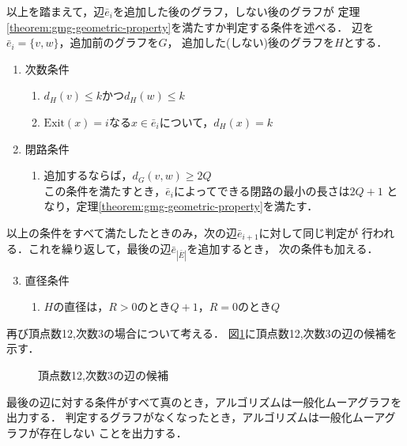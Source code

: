 以上を踏まえて，辺$\bar{e}_i$を追加した後のグラフ，しない後のグラフが
定理\ref{theorem:gmg-geometric-property}を満たすか判定する条件を述べる．
辺を$\bar{e}_i=\{v,w\}$，追加前のグラフを$G$，
追加した(しない)後のグラフを$H$とする．
\begin{enumerate}
\item 次数条件
  \label{item:degree-constraint}
  \begin{enumerate}
  \item $d_H(v)\leq k$かつ$d_H(w)\leq k$
  \item $\mathrm{Exit}(x)=i$なる$x\in\bar{e}_i$について，$d_H(x)=k$
  \end{enumerate}
\item 閉路条件
  \label{item:cycle-constraint}
  \begin{enumerate}
  \item 追加するならば，$d_G(v,w)\geq2Q$\\
    この条件を満たすとき，$\bar{e}_i$によってできる閉路の最小の長さは$2Q+1$
    となり，定理\ref{theorem:gmg-geometric-property}を満たす．
  \end{enumerate}
\end{enumerate}
以上の条件をすべて満たしたときのみ，次の辺$\bar{e}_{i+1}$に対して同じ判定が
行われる．これを繰り返して，最後の辺$\bar{e}_{|\bar{E}|}$を追加するとき，
次の条件も加える．
\begin{enumerate}\setcounter{enumi}{2}
\item 直径条件
  \label{item:diameter-constraint}
  \begin{enumerate}
  \item $H$の直径は，$R>0$のとき$Q+1$，$R=0$のとき$Q$
  \end{enumerate}
\end{enumerate}

\begin{example}
  再び頂点数12,次数3の場合について考える．
  図\ref{fig:feasible-edges-example}に頂点数12,次数3の辺の候補を示す．
  \begin{figure}
    \centering
    \def\svgwidth{.5\columnwidth}
    
    \caption{頂点数12,次数3の辺の候補}
    \label{fig:feasible-edges-example}
  \end{figure}
\end{example}

最後の辺に対する条件がすべて真のとき，アルゴリズムは一般化ムーアグラフを出力する．
判定するグラフがなくなったとき，アルゴリズムは一般化ムーアグラフが存在しない
ことを出力する．

